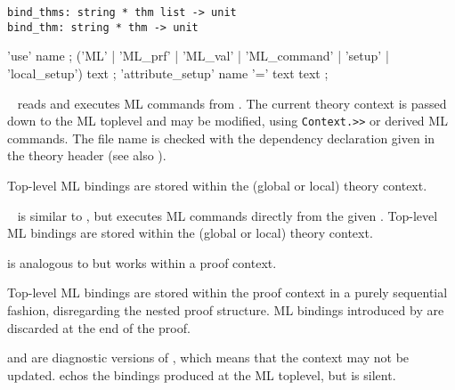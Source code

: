 \begin{isabellebody}
\begin{isamarkuptext}
  \begin{mldecls}
    \verb|bind_thms: string * thm list -> unit| \\
    \verb|bind_thm: string * thm -> unit| \\
  \end{mldecls}

  \begin{rail}
    'use' name
    ;
    ('ML' | 'ML\_prf' | 'ML\_val' | 'ML\_command' | 'setup' | 'local\_setup') text
    ;
    'attribute\_setup' name '=' text text
    ;
  \end{rail}

  \begin{description}

  \item \hyperlink{command.use}{\mbox{}}~ reads and executes ML
  commands from .  The current theory context is passed
  down to the ML toplevel and may be modified, using \verb|Context.>>| or derived ML commands.  The file name is checked with
  the \hyperlink{keyword.uses}{\mbox{}} dependency declaration given in the theory
  header (see also ).

  Top-level ML bindings are stored within the (global or local) theory
  context.
  
  \item \hyperlink{command.ML}{\mbox{}}~ is similar to \hyperlink{command.use}{\mbox{}},
  but executes ML commands directly from the given .
  Top-level ML bindings are stored within the (global or local) theory
  context.

  \item \hyperlink{command.ML-prf}{\mbox{}} is analogous to \hyperlink{command.ML}{\mbox{}} but works
  within a proof context.

  Top-level ML bindings are stored within the proof context in a
  purely sequential fashion, disregarding the nested proof structure.
  ML bindings introduced by \hyperlink{command.ML-prf}{\mbox{}} are discarded at the
  end of the proof.

  \item \hyperlink{command.ML-val}{\mbox{}} and \hyperlink{command.ML-command}{\mbox{}} are diagnostic
  versions of \hyperlink{command.ML}{\mbox{}}, which means that the context may not be
  updated.  \hyperlink{command.ML-val}{\mbox{}} echos the bindings produced at the ML
  toplevel, but \hyperlink{command.ML-command}{\mbox{}} is silent.
  

\end{description}
\end{isamarkuptext}
\end{isabellebody}

